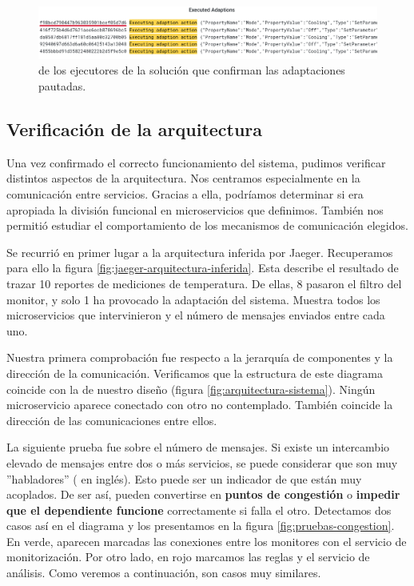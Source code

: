 \begin{figure}[htb]
  \hspace{-0.9cm}
  \includegraphics[scale=1.85]{cap_despliegue/images/Pruebas-logs-adaptaciones}
  \caption{ de los ejecutores de la solución que confirman las adaptaciones pautadas.}
  \label{fig:prueba-logs-adaptaciones}
\end{figure}

\pagebreak

\subsection{Verificación de la arquitectura}

Una vez confirmado el correcto funcionamiento del sistema, pudimos verificar distintos aspectos de la arquitectura. Nos centramos especialmente en la comunicación entre servicios. Gracias a ella, podríamos determinar si era apropiada la división funcional en microservicios que definimos. También nos permitió estudiar el comportamiento de los mecanismos de comunicación elegidos.

Se recurrió en primer lugar a la arquitectura inferida por Jaeger. Recuperamos para ello la figura \ref{fig:jaeger-arquitectura-inferida}. Esta describe el resultado de trazar 10 reportes de mediciones de temperatura. De ellas, 8 pasaron el filtro del monitor, y solo 1 ha provocado la adaptación del sistema. Muestra todos los microservicios que intervinieron y el número de mensajes enviados entre cada uno.

Nuestra primera comprobación fue respecto a la jerarquía de componentes y la dirección de la comunicación. Verificamos que la estructura de este diagrama coincide con la de nuestro diseño (figura \ref{fig:arquitectura-sistema}). Ningún microservicio aparece conectado con otro no contemplado. También coincide la dirección de las comunicaciones entre ellos.

La siguiente prueba fue sobre el número de mensajes. Si existe un intercambio elevado de mensajes entre dos o más servicios, se puede considerar que son muy ''habladores'' ( en inglés). Esto puede ser un indicador de que están muy acoplados. \cite{singjaiPatternsDerivingAPIs2021} De ser así, pueden convertirse en \textbf{puntos de congestión} o \textbf{impedir que el dependiente funcione} correctamente si falla el otro. Detectamos dos casos así en el diagrama y los presentamos en la figura \ref{fig:pruebas-congestion}. En verde, aparecen marcadas las conexiones entre los monitores con el servicio de monitorización. Por otro lado, en rojo marcamos las reglas y el servicio de análisis. Como veremos a continuación, son casos muy similares.

